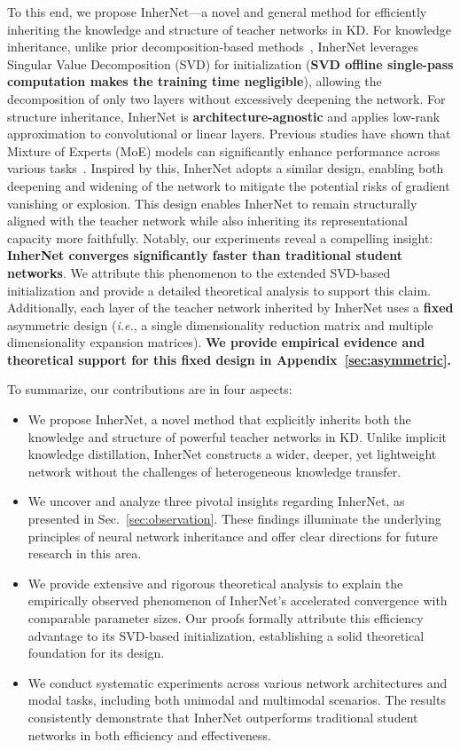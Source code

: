 \documentclass{article} %
\begin{document}
To this end, we propose InherNet—a novel and general method for efficiently inheriting the knowledge and structure of teacher networks in KD. For knowledge inheritance, unlike prior decomposition-based methods~\citep{jaderberg2014speeding}, InherNet leverages Singular Value Decomposition (SVD) for initialization (\textbf{SVD offline single-pass computation makes the training time negligible}), allowing the decomposition of only two layers without excessively deepening the network. For structure inheritance, InherNet is \textbf{architecture-agnostic} and applies low-rank approximation to convolutional or linear layers. Previous studies have shown that Mixture of Experts (MoE) models can significantly enhance performance across various tasks~\citep{zhou2022mixture, tian2024hydralora, gao2024higher, cai2024survey}. Inspired by this, InherNet adopts a similar design, enabling both deepening and widening of the network to mitigate the potential risks of gradient vanishing or explosion. This design enables InherNet to remain structurally aligned with the teacher network while also inheriting its representational capacity more faithfully. Notably, our experiments reveal a compelling insight: \textbf{InherNet converges significantly faster than traditional student networks}. We attribute this phenomenon to the extended SVD-based initialization and provide a detailed theoretical analysis to support this claim. Additionally, each layer of the teacher network inherited by InherNet uses a \textbf{fixed} asymmetric design (\textit{i.e.}, a single dimensionality reduction matrix and multiple dimensionality expansion matrices). \textbf{We provide empirical evidence and theoretical support for this fixed design in Appendix~\ref{sec:asymmetric}.}


To summarize, our contributions are in four aspects:
\begin{itemize}
    \item{We propose InherNet, a novel method that explicitly inherits both the knowledge and structure of powerful teacher networks in KD. Unlike implicit knowledge distillation, InherNet constructs a wider, deeper, yet lightweight network without the challenges of heterogeneous knowledge transfer.}
    \item{We uncover and analyze three pivotal insights regarding InherNet, as presented in Sec.~\ref{sec:observation}. These findings illuminate the underlying principles of neural network inheritance and offer clear directions for future research in this area.}
    \item{We provide extensive and rigorous theoretical analysis to explain the empirically observed phenomenon of InherNet's accelerated convergence with comparable parameter sizes. Our proofs formally attribute this efficiency advantage to its SVD-based initialization, establishing a solid theoretical foundation for its design.}
    \item{We conduct systematic experiments across various network architectures and modal tasks, including both unimodal and multimodal scenarios. The results consistently demonstrate that InherNet outperforms traditional student networks in both efficiency and effectiveness.}
\end{itemize}
\end{document}
